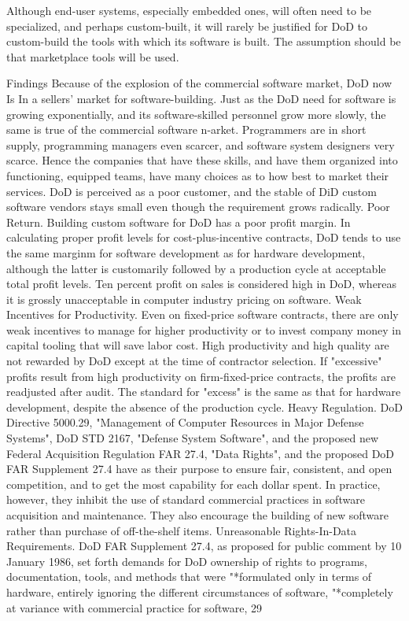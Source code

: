\documentclass[12pt]{article}
\begin{document}
Although end-user systems, especially embedded ones, will often need to be
specialized, and perhaps custom-built, it will rarely be justified for DoD to
custom-build the tools with which its software is built. The assumption should
be that marketplace tools will be used.


Findings
Because of the explosion of the commercial software market, DoD now Is
In a sellers' market for software-building.
Just as the DoD need for software is growing exponentially, and its software-skilled personnel grow more slowly, the same is true of the commercial software n-arket. Programmers
are in short supply, programming managers even scarcer, and software system designers
very scarce. Hence the companies that have these skills, and have them organized into
functioning, equipped teams, have many choices as to how best to market their services.
DoD is perceived as a poor customer, and the stable of DiD custom software
vendors stays small even though the requirement grows radically.
Poor Return. Building custom software for DoD has a poor profit margin. In calculating
proper profit levels for cost-plus-incentive contracts, DoD tends to use the same marginm
for software development as for hardware development, although the latter is customarily
followed by a production cycle at acceptable total profit levels. Ten percent profit on sales
is considered high in DoD, whereas it is grossly unacceptable in computer industry pricing
on software.
Weak Incentives for Productivity.
Even on fixed-price software contracts, there
are only weak incentives to manage for higher productivity or to invest company money
in capital tooling that will save labor cost. High productivity and high quality are not
rewarded by DoD except at the time of contractor selection. If "excessive" profits result
from high productivity on firm-fixed-price contracts, the profits are readjusted after audit.
The standard for "excess" is the same as that for hardware development, despite the
absence of the production cycle.
Heavy Regulation. DoD Directive 5000.29, "Management of Computer Resources in
Major Defense Systems", DoD STD 2167, "Defense System Software", and the proposed
new Federal Acquisition Regulation FAR 27.4, "Data Rights", and the proposed DoD FAR
Supplement 27.4 have as their purpose to ensure fair, consistent, and open competition,
and to get the most capability for each dollar spent. In practice, however, they inhibit the
use of standard commercial practices in software acquisition and maintenance. They also
encourage the building of new software rather than purchase of off-the-shelf items.
Unreasonable Rights-In-Data Requirements.
DoD FAR Supplement 27.4, as
proposed for public comment by 10 January 1986, set forth demands for DoD ownership
of rights to programs, documentation, tools, and methods that were
"*formulated only in terms of hardware, entirely ignoring the different circumstances
of software,
"*completely at variance with commercial practice for software,
29
\end{document}
